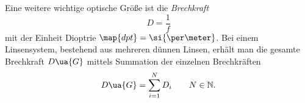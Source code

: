 Eine weitere wichtige optische Größe ist die \emph{Brechkraft}
\begin{equation}
  \label{eq: brechkraft}
  D=\frac{1}{f}
\end{equation}
mit der Einheit Dioptrie $\map{dpt}=\si{\per \meter}$.
Bei einem Linsensystem, bestehend aus mehreren dünnen Linsen, erhält man die gesamte %
Brechkraft $D\ua{G}$ mittels Summation der einzelnen Brechkräften %
\begin{equation*}
  D\ua{G}=\sum_{i=1}^{N}D_i \qquad N\in\mathbb{N}.
\end{equation*}
